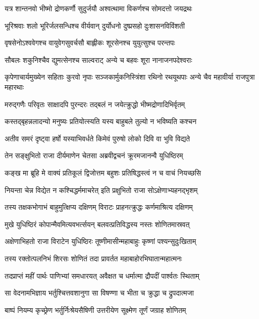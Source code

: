 \twolineshloka
{यत्र शान्तनवो भीष्मो द्रोणकर्णौ सुदुर्जयौ}
{अश्वत्थामा विकर्णश्च सोमदत्तो जयद्रथः}


\twolineshloka
{भूरिश्रवाः शलो भूरिर्जलसन्धिश्च वीर्यवान्}
{दुर्योधनो दुष्प्रसहो दुःशासनविविंशती}


\twolineshloka
{वृषसेनोऽश्ववेगश्च वायुवेगसुवर्चसौ}
{बाह्लीकः शूरसेनश्च युयुत्सुश्च परन्तपः}


\twolineshloka
{सौबलः शकुनिश्चैव द्युमत्सेनश्च साल्वराट्}
{अन्ये च बहवः शूरा नानाजनपदेश्वराः}


\threelineshloka
{कृपेणाचार्यमुख्येन सहिताः कुरवो नृपाः}
{सञ्जकार्मुकनिस्त्रिंशा रथिनो रथयूथपाः}
{अन्ये चैव महावीर्या राजपुत्रा महारथाः}


\twolineshloka
{मरुद्गणैः परिवृतः साक्षादपि पुरन्दरः}
{तद्बलं न जयेत्क्रुद्धो भीष्मद्रोणादिभिर्वृतम्}


\twolineshloka
{कस्तद्बृहन्नलादन्यो मनुष्यः प्रतियोत्स्यति}
{यस्य बाहुबले तुल्यो न भविष्यति कश्चन}


\twolineshloka
{अतीव समरं दृष्ट्वा हर्षो यस्याभिवर्धते}
{किमेवं पुरुषो लोको दिवि वा भुवि विद्यते}



\twolineshloka
{तेन सङ्क्षुभितो राजा दीर्यमाणेन चेतसा}
{अब्रवीद्वचनं क्रूरमजानन्वै युधिष्ठिरम्}


\twolineshloka
{कङ्ख मा ब्रूहि मे वाक्यं प्रतिकूलं द्विजोत्तम}
{बहुशः प्रतिषिद्धस्त्वं न च वाचं नियच्छसि}


\twolineshloka
{नियन्ता चेन्न विद्येत न कश्चिद्धर्ममाचरेत्}
{इति प्रक्षुभितो राजा सोऽक्षेणाभ्यहनद्भृशम्}


\twolineshloka
{तस्य तक्षकभोगाभं बाहुमुत्क्षिप्य दक्षिणम्}
{विराटः प्राहनत्क्रुद्धः कर्णमाश्रित्य दक्षिणम्}


\twolineshloka
{मुखे युधिष्ठिरं कोपान्मैवमित्यवभर्त्सयन्}
{बलवत्प्रतिविद्धस्य नस्तः शोणितमास्रवत्}


\twolineshloka
{अक्षेणाभिहतो राजा विराटेन युधिष्ठिरः}
{तूष्णीमासीन्महाबाहुः कृष्णां पश्यन्सुदुःखिताम्}


\twolineshloka
{तस्य रक्तोत्पलनिभं शिरसः शोणितं तदा}
{प्रावर्तत महाबाहोरभिघातान्महात्मनः}


\twolineshloka
{तदप्राप्तं महीं पार्थः पाणिभ्यां समधारयत्}
{अवैक्षत च धर्मात्मा द्रौपदीं पार्श्वतः स्थिताम्}


\twolineshloka
{सा वेदनामभिज्ञाय भर्तुश्चित्तवशानुगा}
{सा विषण्णा च भीता च क्रुद्धा च द्रुपदात्मजा}


\twolineshloka
{बाष्पं नियम्य कृच्छ्रेण भर्तुर्निःश्रेयसैषिणी}
{उत्तरीयेण सूक्ष्मेण तूर्णं जग्राह शोणितम्}


